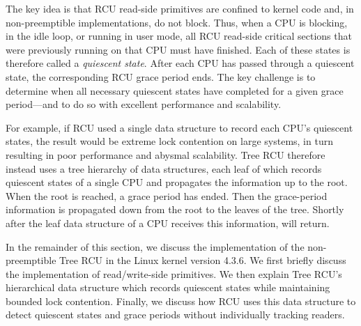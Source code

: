 %
% 
The key idea is that RCU read-side primitives are confined to kernel code and,
in non-pre\-emptible implementations, do not block.
Thus, when a CPU is blocking, in the idle loop, or running in user mode,
all RCU read-side critical sections that were previously running on that CPU
must have finished. Each of these states is therefore called a \emph{quiescent state}. 
After each CPU has passed through a quiescent state, the corresponding RCU grace period ends.
The key challenge is to determine when all necessary quiescent
states have completed for a given grace period---and to do so with
excellent performance and scalability.

For example, if RCU used a single data structure to record each CPU's
quiescent states, the result would be extreme lock contention on large systems,
in turn resulting in poor performance and abysmal scalability.
Tree RCU therefore instead uses a tree hierarchy of data structures, 
each leaf of which records quiescent states of a single CPU and propagates the information 
up to the root. When the root is reached, a grace period has ended. Then the grace-period
information is propagated down from the root to the leaves of the tree.
Shortly after the leaf data 
structure of a CPU receives this information,  will return.

In the remainder of this section, we discuss the implementation of the non-pre\-empt\-ible 
Tree RCU in the Linux kernel version 4.3.6. We first briefly discuss the implementation of 
read/write-side primitives.
We then explain Tree RCU's hierarchical data structure which records quiescent states while 
maintaining bounded lock contention. Finally, we discuss how RCU uses this data structure 
to detect quiescent states and %
grace periods without individually tracking readers.






